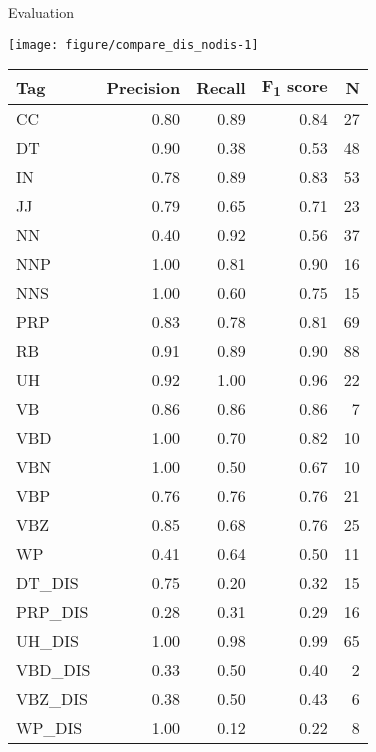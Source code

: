 \documentclass{beamer}\usepackage[]{graphicx}\usepackage[]{color}
\makeatletter
\def\maxwidth{ %
  \ifdim\Gin@nat@width>\linewidth
    \linewidth
  \else
    \Gin@nat@width
  \fi
}
\makeatother
\begin{document}
\begin{frame}[t]{}
\begin{columns}
\begin{block}{Evaluation}
{\texttt{[image: figure/compare\_dis\_nodis-1]} 

          }
          \parbox{0.45\linewidth}{
            \begin{tabular}{l r r r r}
              Tag          & Precision & Recall & F\textsubscript{1} score & N \\
              \hline
              CC           & 0.80      & 0.89   & 0.84 &  27 \\
              DT           & 0.90      & 0.38   & 0.53 &  48 \\
              IN           & 0.78      & 0.89   & 0.83 &  53 \\
              JJ           & 0.79      & 0.65   & 0.71 &  23 \\
              NN           & 0.40      & 0.92   & 0.56 &  37 \\
              NNP          & 1.00      & 0.81   & 0.90 &  16 \\
              NNS          & 1.00      & 0.60   & 0.75 &  15 \\
              PRP          & 0.83      & 0.78   & 0.81 &  69 \\
              RB           & 0.91      & 0.89   & 0.90 &  88 \\
              UH           & 0.92      & 1.00   & 0.96 &  22 \\
              VB           & 0.86      & 0.86   & 0.86 &   7 \\
              VBD          & 1.00      & 0.70   & 0.82 &  10 \\
              VBN          & 1.00      & 0.50   & 0.67 &  10 \\
              VBP          & 0.76      & 0.76   & 0.76 &  21 \\
              VBZ          & 0.85      & 0.68   & 0.76 &  25 \\
              WP           & 0.41      & 0.64   & 0.50 &  11 \\
              DT\_DIS      & 0.75      & 0.20   & 0.32 &  15 \\
              PRP\_DIS     & 0.28      & 0.31   & 0.29 &  16 \\
              UH\_DIS      & 1.00      & 0.98   & 0.99 &  65 \\
              VBD\_DIS     & 0.33      & 0.50   & 0.40 &   2 \\
              VBZ\_DIS     & 0.38      & 0.50   & 0.43 &   6 \\
              WP\_DIS      & 1.00      & 0.12   & 0.22 &   8 \\

\end{tabular}}
\end{block}
\end{columns}
\end{frame}
\end{document}
